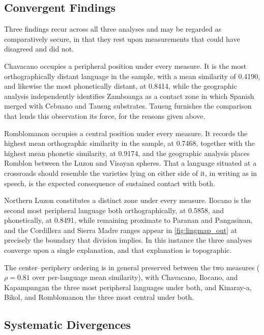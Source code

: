\subsection{Convergent Findings}

Three findings recur across all three analyses and may be regarded as
comparatively secure, in that they rest upon measurements that could have
disagreed and did not.

Chavacano occupies a peripheral position under every measure. It is the most
orthographically distant language in the sample, with a mean similarity of
0.4190, and likewise the most phonetically distant, at 0.8414, while the
geographic analysis independently identifies Zamboanga as a contact zone in
which Spanish merged with Cebuano and Tausug substrates. Tausug furnishes the
comparison that lends this observation its force, for the reasons given above.

Romblomanon occupies a central position under every measure. It records the
highest mean orthographic similarity in the sample, at 0.7468, together with
the highest mean phonetic similarity, at 0.9174, and the geographic analysis
places Romblon between the Luzon and Visayan spheres. That a language situated
at a crossroads should resemble the varieties lying on either side of it, in
writing as in speech, is the expected consequence of sustained contact with
both.

Northern Luzon constitutes a distinct zone under every measure. Ilocano is the
second most peripheral language both orthographically, at 0.5858, and
phonetically, at 0.8491, while remaining proximate to Paranan and Pangasinan,
and the Cordillera and Sierra Madre ranges appear in \cref{fig:lingmap_out} at
precisely the boundary that division implies. In this instance the three
analyses converge upon a single explanation, and that explanation is
topographic.

The center--periphery ordering is in general preserved between the two measures
(\( \rho = 0.81 \) over per-language mean similarity), with Chavacano, Ilocano,
and Kapampangan the three most peripheral languages under both, and Kinaray-a,
Bikol, and Romblomanon the three most central under both.

\subsection{Systematic Divergences}

